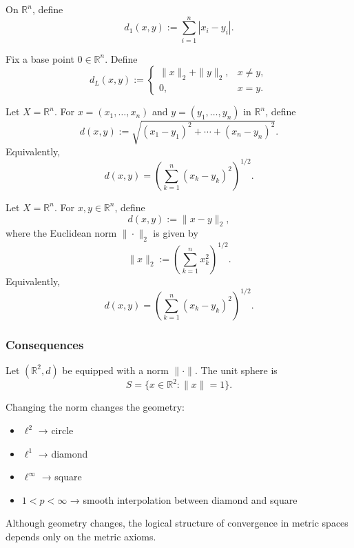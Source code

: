 \begin{example}
On $\mathbb{R}^n$, define
\[
d_1(x,y) := \sum_{i=1}^n |x_i - y_i|.
\]
\end{example}

\begin{example}
Fix a base point $0\in\mathbb{R}^n$.
Define
\[
d_L(x,y) :=
\begin{cases}
\|x\|_2 + \|y\|_2, & x \neq y,\\
0, & x = y.
\end{cases}
\]
\end{example}

\begin{example}
Let $X = \mathbb{R}^n$. For $x = (x_1,\dots,x_n)$ and 
$y = (y_1,\dots,y_n)$ in $\mathbb{R}^n$, define
\[
d(x,y)
:=
\sqrt{(x_1 - y_1)^2 + \cdots + (x_n - y_n)^2}.
\]
Equivalently,
\[
d(x,y) = \left( \sum_{k=1}^n (x_k - y_k)^2 \right)^{1/2}.
\]
\end{example}

\begin{example}
Let $X = \mathbb{R}^n$. For $x,y \in \mathbb{R}^n$, define
\[
d(x,y) := \|x - y\|_2,
\]
where the Euclidean norm $\|\cdot\|_2$ is given by
\[
\|x\|_2 := \left( \sum_{k=1}^n x_k^2 \right)^{1/2}.
\]
Equivalently,
\[
d(x,y)
=
\left( \sum_{k=1}^n (x_k - y_k)^2 \right)^{1/2}.
\]
\end{example}

\subsubsection{Consequences}

\begin{remark}
Let $(\mathbb{R}^2,d)$ be equipped with a norm $\|\cdot\|$.
The unit sphere is
\[
S = \{ x \in \mathbb{R}^2 : \|x\| = 1 \}.
\]

Changing the norm changes the geometry:

\begin{itemize}
\item $\ell^2$ → circle
\item $\ell^1$ → diamond
\item $\ell^\infty$ → square
\item $1<p<\infty$ → smooth interpolation between diamond and square
\end{itemize}

Although geometry changes, the logical structure of convergence
in metric spaces depends only on the metric axioms.
\end{remark}


